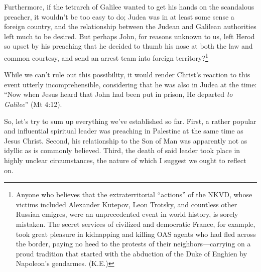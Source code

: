 Furthermore, if the tetrarch of Galilee wanted to get his hands on the scandalous preacher, it wouldn't be too easy to do; Judea was in at least some sense a foreign country, and the relationship between the Judean and Galilean authorities left much to be desired. But perhaps John, for reasons unknown to us, left Herod so upset by his preaching that he decided to thumb his nose at both the law and common courtesy, and send an arrest team into foreign territory?\footnote{Anyone who believes that the extraterritorial ``actions'' of the NKVD, whose victims included Alexander Kutepov, Leon Trotsky, and countless other Russian emigres, were an unprecedented event in world history, is sorely mistaken. The secret services of civilized and democratic France, for example, took great pleasure in kidnapping and killing OAS agents who had fled across the border, paying no heed to the protests of their neighbors---carrying on a proud tradition that started with the abduction of the Duke of Enghien by Napoleon's gendarmes. (K.E.)}

While we can't rule out this possibility, it would render Christ's reaction to this event utterly incomprehensible, considering that he was also in Judea at the time: ``Now when Jesus heard that John had been put in prison, He departed \emph{to Galilee}'' (Mt 4:12).

So, let's try to sum up everything we've established so far. First, a rather popular and influential spiritual leader was preaching in Palestine at the same time as Jesus Christ. Second, his relationship to the Son of Man was apparently not as idyllic as is commonly believed. Third, the death of said leader took place in highly unclear circumstances, the nature of which I suggest we ought to reflect on.